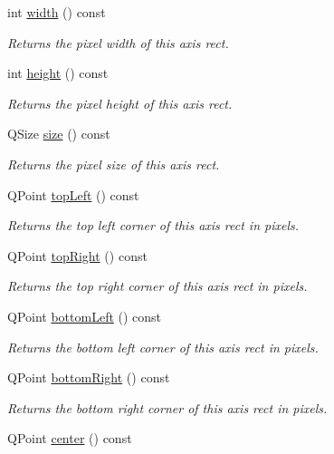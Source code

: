 \begin{DoxyCompactItemize}
int \hyperlink{classQCPAxisRect_a45bf5c17f4ca29131b7eb0db06efc259}{width} () const 
\begin{DoxyCompactList}\small\item\em Returns the pixel width of this axis rect. \end{DoxyCompactList}\item 
int \hyperlink{classQCPAxisRect_a1c55c4f3bef40cf01b21820316c8469e}{height} () const 
\begin{DoxyCompactList}\small\item\em Returns the pixel height of this axis rect. \end{DoxyCompactList}\item 
Q\+Size \hyperlink{classQCPAxisRect_a871b9fe49e92b39a3cbe29a59e458536}{size} () const 
\begin{DoxyCompactList}\small\item\em Returns the pixel size of this axis rect. \end{DoxyCompactList}\item 
Q\+Point \hyperlink{classQCPAxisRect_a88acbe716bcf5072790a6f95637c40d8}{top\+Left} () const 
\begin{DoxyCompactList}\small\item\em Returns the top left corner of this axis rect in pixels. \end{DoxyCompactList}\item 
Q\+Point \hyperlink{classQCPAxisRect_a232409546394c23b59407bc62fa460a8}{top\+Right} () const 
\begin{DoxyCompactList}\small\item\em Returns the top right corner of this axis rect in pixels. \end{DoxyCompactList}\item 
Q\+Point \hyperlink{classQCPAxisRect_a724b0333971ea6a338f0dbd814dc97ae}{bottom\+Left} () const 
\begin{DoxyCompactList}\small\item\em Returns the bottom left corner of this axis rect in pixels. \end{DoxyCompactList}\item 
Q\+Point \hyperlink{classQCPAxisRect_a49ea3c7dff834b47e266cbf3d79f78b9}{bottom\+Right} () const 
\begin{DoxyCompactList}\small\item\em Returns the bottom right corner of this axis rect in pixels. \end{DoxyCompactList}\item 
Q\+Point \hyperlink{classQCPAxisRect_aea5e6042bca198424fa1bc02fc282e59}{center} () const 

\end{DoxyCompactItemize}
